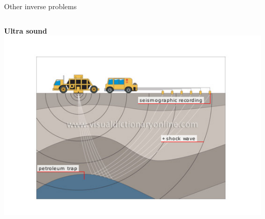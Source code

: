 \documentclass{beamer}
\begin{document}
\begin{frame}{Other inverse problems}


\begin{columns}[T]

     {\bf Ultra sound}\\
    \includegraphics[width=.7\textwidth, trim={6.7em 4em 7em 5em}, clip]{InverseProblem_petroleum}


\end{columns}
\end{frame}
\end{document}
